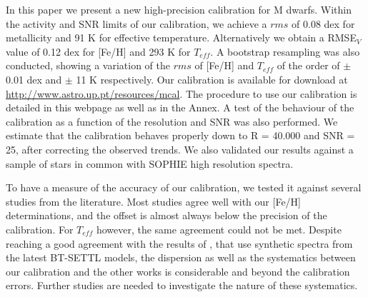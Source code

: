 \documentclass{aa}
\begin{document}
In this paper we present a new high-precision calibration for M dwarfs. Within the activity and SNR limits of our calibration, we achieve a $rms$ of 0.08 dex for metallicity and 91 K for effective temperature. Alternatively we obtain a RMSE$_{V}$ value of 0.12 dex for [Fe/H] and 293 K for $T_{eff}$. A bootstrap resampling was also conducted, showing a variation of the $rms$ of [Fe/H] and $T_{eff}$ of the order of $\pm$ 0.01 dex and $\pm$ 11 K respectively. Our calibration is available for download at \url{http://www.astro.up.pt/resources/mcal}. The procedure to use our calibration is detailed in this webpage as well as in the Annex. A test of the behaviour of the calibration as a function of the resolution and SNR was also performed. We estimate that the calibration behaves properly down to R = 40.000 and SNR = 25, after correcting the observed trends. We also validated our results against a sample of stars in common with SOPHIE high resolution spectra.


To have a measure of the accuracy of our calibration, we tested it against several studies from the literature. Most studies agree well with our [Fe/H] determinations, and the offset is almost always below the precision of the calibration. For $T_{eff}$ however, the same agreement could not be met. Despite reaching a good agreement with the results of \citet{Rajpurohit-2013a}, that use synthetic spectra from the latest BT-SETTL models, the dispersion as well as the systematics between our calibration and the other works is considerable and beyond the calibration errors. Further studies are needed to investigate the nature of these systematics. 






\end{document}
